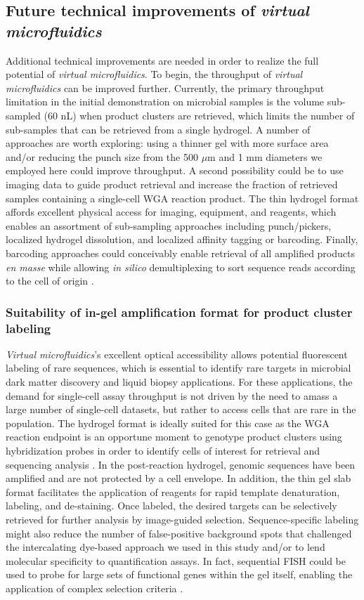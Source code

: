 \subsection{Future technical improvements of \textit{virtual microfluidics}}
Additional technical improvements are needed in order to realize the full potential of \textit{virtual microfluidics}. To begin, the throughput of \textit{virtual microfluidics} can be improved further. Currently, the primary throughput limitation in the initial demonstration on microbial samples is the volume sub-sampled (60 nL) when product clusters are retrieved, which limits the number of sub-samples that can be retrieved from a single hydrogel. A number of approaches are worth exploring: using a thinner gel with more surface area and\slash or reducing the punch size from the 500 $\mu$m and 1 mm diameters we employed here could improve throughput. A second possibility could be to use imaging data to guide product retrieval and increase the fraction of retrieved samples containing a single-cell WGA reaction product. The thin hydrogel format affords excellent physical access for imaging, equipment, and reagents, which enables an assortment of sub-sampling approaches including punch\slash pickers, localized hydrogel dissolution, and localized affinity tagging or barcoding. Finally, barcoding approaches could conceivably enable retrieval of all amplified products \textit{en masse} while allowing \textit{in silico} demultiplexing to sort sequence reads according to the cell of origin \cite{Crosetto:2015vd}.

\subsubsection{Suitability of in-gel amplification format for product cluster labeling}
\textit{Virtual microfluidics}'s excellent optical accessibility allows potential fluorescent labeling of rare sequences, which is essential to identify rare targets in microbial dark matter discovery and liquid biopsy applications. For these applications, the demand for single-cell assay throughput is not driven by the need to amass a large number of single-cell datasets, but rather to access cells that are rare in the population. The hydrogel format is ideally suited for this case as the WGA reaction endpoint is an opportune moment to genotype product clusters using hybridization probes in order to identify cells of interest for retrieval and sequencing analysis \cite{Niki:1997vq,Yamada:2011kf}. In the post-reaction hydrogel, genomic sequences have been amplified and are not protected by a cell envelope. In addition, the thin gel slab format facilitates the application of reagents for rapid template denaturation, labeling, and de-staining. Once labeled, the desired targets can be selectively retrieved for further analysis by image-guided selection. Sequence-specific labeling might also reduce the number of false-positive background spots that challenged the intercalating dye-based approach we used in this study and\slash or to lend molecular specificity to quantification assays. In fact, sequential FISH could be used to probe for large sets of functional genes within the gel itself, enabling the application of complex selection criteria \cite{Lubeck:2014jx}. 

